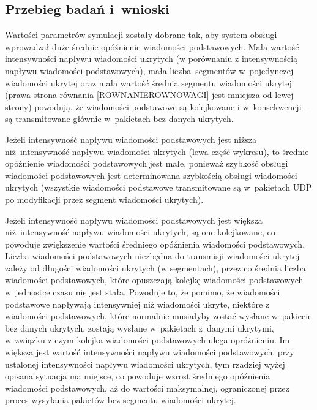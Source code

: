 \documentclass[a4paper, twoside, 12pt]{report}
\begin{document}
        \subsection{Przebieg badań i~wnioski}
            Wartości parametrów symulacji zostały dobrane tak, aby system obsługi
            wprowadzał duże średnie opóźnienie wiadomości podstawowych. Mała wartość intensywności
            napływu wiadomości ukrytych (w porównaniu z intensywnością napływu wiadomości podstawowych),
            mała liczba segmentów w~pojedynczej
            wiadomości ukrytej oraz mała wartość średnia segmentu
            wiadomości ukrytej (prawa strona równania \ref{ROWNANIEROWNOWAGI} jest mniejsza od lewej strony)
            powodują, że wiadomości podstawowe są kolejkowane i
            w~konsekwencji -- są transmitowane głównie w~pakietach bez danych ukrytych.

            Jeżeli intensywność napływu wiadomości podstawowych
            jest niższa niż intensywność napływu wiadomości ukrytych (lewa część wykresu),
            to średnie opóźnienie wiadomości
            podstawowych jest małe, ponieważ szybkość obsługi wiadomości podstawowych jest
            determinowana szybkością obsługi wiadomości ukrytych (wszystkie wiadomości podstawowe transmitowane
            są w~pakietach UDP po modyfikacji przez segment wiadomości ukrytych).

            Jeżeli intensywność napływu wiadomości
            podstawowych jest większa niż intensywność napływu wiadomości ukrytych, są one kolejkowane,
            co powoduje zwiększenie wartości średniego opóźnienia wiadomości podstawowych.
            Liczba wiadomości podstawowych niezbędna do transmisji wiadomości ukrytej
            zależy od długości wiadomości ukrytych (w segmentach),
            przez co średnia liczba wiadomości podstawowych, które opuszczają kolejkę wiadomości
            podstawowych w~jednostce czasu nie jest stała. Powoduje to, że pomimo,
            że wiadomości podstawowe napływają intensywniej niż wiadomości ukryte,
            niektóre z wiadomości podstawowych, które normalnie musiałyby zostać
            wysłane w~pakiecie bez danych ukrytych, zostają wysłane w~pakietach
            z~danymi ukrytymi, w~związku z czym kolejka wiadomości podstawowych
            ulega opróżnieniu. Im większa jest wartość intensywności napływu wiadomości
            podstawowych, przy ustalonej intensywności napływu wiadomości ukrytych,
            tym rzadziej wyżej opisana sytuacja ma miejsce, co powoduje
            wzrost średniego opóźnienia wiadomości podstawowych, aż do wartości
            maksymalnej, ograniczonej przez proces wysyłania pakietów bez segmentu wiadomości ukrytej.
\end{document}
